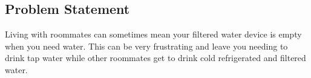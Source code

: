 \subsection{Problem Statement}

Living with roommates can sometimes mean your filtered water device is empty when you need water. 
This can be very frustrating and leave you needing to drink tap water while other roommates get to drink cold refrigerated and filtered water.
